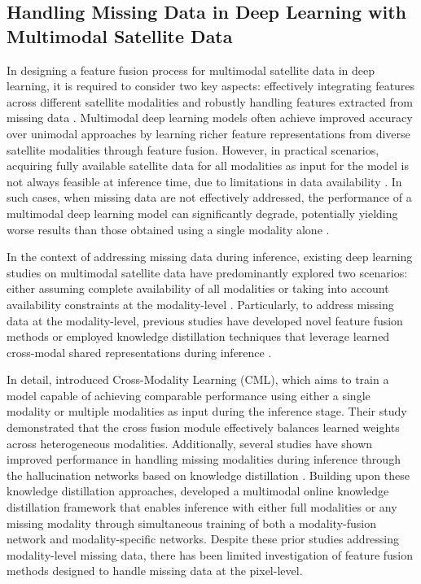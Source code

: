 \documentclass[preprint,12pt,authoryear]{elsarticle}
\begin{document}
\subsection{Handling Missing Data in Deep Learning with Multimodal Satellite Data}
\label{Section2.3}

In designing a feature fusion process for multimodal satellite data in deep learning, it is required to consider two key aspects: effectively integrating features across different satellite modalities and robustly handling features extracted from missing data \citep{liu2024multimodal}. Multimodal deep learning models often achieve improved accuracy over unimodal approaches by learning richer feature representations from diverse satellite modalities through feature fusion. However, in practical scenarios, acquiring fully available satellite data for all modalities as input for the model is not always feasible at inference time, due to limitations in data availability \citep{kampffmeyer2018urban, li2021dynamic, liu2024multimodal, wei2023msh}. In such cases, when missing data are not effectively addressed, the performance of a multimodal deep learning model can significantly degrade, potentially yielding worse results than those obtained using a single modality alone \citep{garnot2022multi}. 

In the context of addressing missing data during inference, existing deep learning studies on multimodal satellite data have predominantly explored two scenarios: either assuming complete availability of all modalities \citep{hosseinpour2022cmgfnet, liu2024review, mena2024common} or taking into account availability constraints at the modality-level \citep{adriano2021learning, hong2020more, kampffmeyer2018urban, li2021dynamic, liu2024multimodal, wei2023msh}. Particularly, to address missing data at the modality-level, previous studies have developed novel feature fusion methods \citep{hong2020more} or employed knowledge distillation techniques that leverage learned cross-modal shared representations during inference \citep{kampffmeyer2018urban, li2021dynamic, liu2024multimodal, wei2023msh}. 

In detail, \cite{hong2020more} introduced Cross-Modality Learning (CML), which aims to train a model capable of achieving comparable performance using either a single modality or multiple modalities as input during the inference stage. Their study demonstrated that the cross fusion module effectively balances learned weights across heterogeneous modalities. Additionally, several studies have shown improved performance in handling missing modalities during inference through the hallucination networks based on knowledge distillation \citep{kampffmeyer2018urban, li2021dynamic, wei2023msh}. Building upon these knowledge distillation approaches, \cite{liu2024multimodal} developed a multimodal online knowledge distillation framework that enables inference with either full modalities or any missing modality through simultaneous training of both a modality-fusion network and modality-specific networks. Despite these prior studies addressing modality-level missing data, there has been limited investigation of feature fusion methods designed to handle missing data at the pixel-level. 
\end{document}
